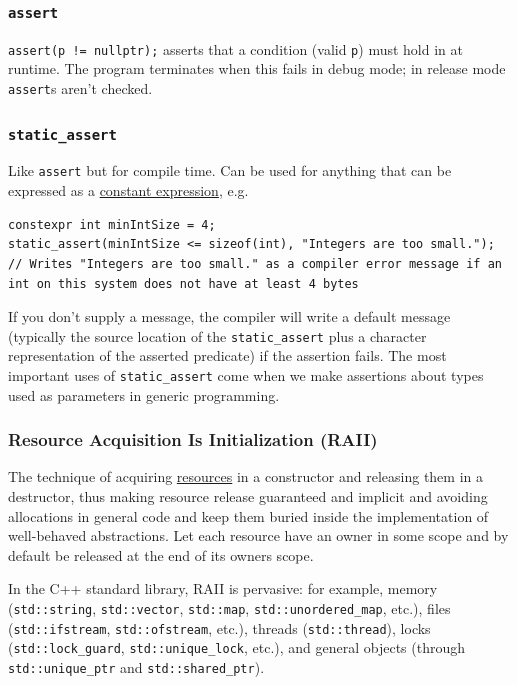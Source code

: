 \documentclass[table, xcdraw]{article}%
\begin{document}
\subsubsection{\texttt{assert}}
\texttt{assert(p != nullptr);} asserts that a condition (valid \texttt{p}) must hold in at runtime. The program terminates when this fails in debug mode; in release mode \texttt{assert}s aren't checked.

\subsubsection{\texttt{static_assert}} \label{static_assert}
Like \texttt{assert} but for compile time. Can be used for anything that can be expressed as a \hyperref[constexpr]{constant expression}, e.g.

\begin{verbatim}
constexpr int minIntSize = 4;
static_assert(minIntSize <= sizeof(int), "Integers are too small."); // Writes "Integers are too small." as a compiler error message if an int on this system does not have at least 4 bytes
\end{verbatim}

If you don't supply a message, the compiler will write a default message (typically the source location of the \texttt{static_assert} plus a character representation of the asserted predicate) if the assertion fails. The most important uses of \texttt{static_assert} come when we make assertions  about types used as parameters in generic programming.

\subsubsection{Resource  Acquisition  Is  Initialization (RAII)}
The technique of acquiring \hyperref[resource]{resources} in a constructor and releasing them in a destructor, thus making resource release guaranteed and implicit and avoiding allocations in general code and keep them buried inside the implementation of well-behaved abstractions. Let each resource have an owner in some scope and by default be released at the end of its owners scope.

In the C++ standard library, RAII is pervasive: for example, memory (\texttt{std::string}, \texttt{std::vector}, \texttt{std::map}, \texttt{std::unordered_map}, etc.), files (\texttt{std::ifstream}, \texttt{std::ofstream}, etc.), threads (\texttt{std::thread}), locks (\texttt{std::lock_guard}, \texttt{std::unique_lock}, etc.), and general objects (through \texttt{std::unique_ptr} and \texttt{std::shared_ptr}).
\end{document}
